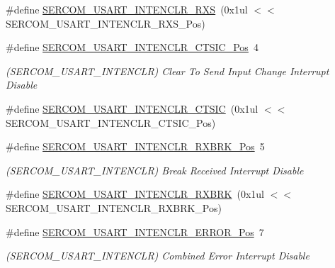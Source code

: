 \begin{DoxyCompactItemize}
\#define \mbox{\hyperlink{group___s_a_m_d21___s_e_r_c_o_m_ga74d2c1af12decedd2d5efebeac00948f}{S\+E\+R\+C\+O\+M\+\_\+\+U\+S\+A\+R\+T\+\_\+\+I\+N\+T\+E\+N\+C\+L\+R\+\_\+\+R\+XS}}~(0x1ul $<$$<$ S\+E\+R\+C\+O\+M\+\_\+\+U\+S\+A\+R\+T\+\_\+\+I\+N\+T\+E\+N\+C\+L\+R\+\_\+\+R\+X\+S\+\_\+\+Pos)
\item 
\#define \mbox{\hyperlink{group___s_a_m_d21___s_e_r_c_o_m_ga0751acc62d29f4afba27cf1972efaba6}{S\+E\+R\+C\+O\+M\+\_\+\+U\+S\+A\+R\+T\+\_\+\+I\+N\+T\+E\+N\+C\+L\+R\+\_\+\+C\+T\+S\+I\+C\+\_\+\+Pos}}~4
\begin{DoxyCompactList}\small\item\em (S\+E\+R\+C\+O\+M\+\_\+\+U\+S\+A\+R\+T\+\_\+\+I\+N\+T\+E\+N\+C\+LR) Clear To Send Input Change Interrupt Disable \end{DoxyCompactList}\item 
\#define \mbox{\hyperlink{group___s_a_m_d21___s_e_r_c_o_m_gaa3bd00b624143ff68630fd01aa7e5500}{S\+E\+R\+C\+O\+M\+\_\+\+U\+S\+A\+R\+T\+\_\+\+I\+N\+T\+E\+N\+C\+L\+R\+\_\+\+C\+T\+S\+IC}}~(0x1ul $<$$<$ S\+E\+R\+C\+O\+M\+\_\+\+U\+S\+A\+R\+T\+\_\+\+I\+N\+T\+E\+N\+C\+L\+R\+\_\+\+C\+T\+S\+I\+C\+\_\+\+Pos)
\item 
\#define \mbox{\hyperlink{group___s_a_m_d21___s_e_r_c_o_m_ga9f4ed3c5eb917a97501f586ae5170e27}{S\+E\+R\+C\+O\+M\+\_\+\+U\+S\+A\+R\+T\+\_\+\+I\+N\+T\+E\+N\+C\+L\+R\+\_\+\+R\+X\+B\+R\+K\+\_\+\+Pos}}~5
\begin{DoxyCompactList}\small\item\em (S\+E\+R\+C\+O\+M\+\_\+\+U\+S\+A\+R\+T\+\_\+\+I\+N\+T\+E\+N\+C\+LR) Break Received Interrupt Disable \end{DoxyCompactList}\item 
\#define \mbox{\hyperlink{group___s_a_m_d21___s_e_r_c_o_m_ga4025eb0f6591ca8b2709996c63aae3dd}{S\+E\+R\+C\+O\+M\+\_\+\+U\+S\+A\+R\+T\+\_\+\+I\+N\+T\+E\+N\+C\+L\+R\+\_\+\+R\+X\+B\+RK}}~(0x1ul $<$$<$ S\+E\+R\+C\+O\+M\+\_\+\+U\+S\+A\+R\+T\+\_\+\+I\+N\+T\+E\+N\+C\+L\+R\+\_\+\+R\+X\+B\+R\+K\+\_\+\+Pos)
\item 
\#define \mbox{\hyperlink{group___s_a_m_d21___s_e_r_c_o_m_ga15a234b6064382e6ba84366e5b2d2871}{S\+E\+R\+C\+O\+M\+\_\+\+U\+S\+A\+R\+T\+\_\+\+I\+N\+T\+E\+N\+C\+L\+R\+\_\+\+E\+R\+R\+O\+R\+\_\+\+Pos}}~7
\begin{DoxyCompactList}\small\item\em (S\+E\+R\+C\+O\+M\+\_\+\+U\+S\+A\+R\+T\+\_\+\+I\+N\+T\+E\+N\+C\+LR) Combined Error Interrupt Disable \end{DoxyCompactList}\item 
$$
\end{DoxyCompactItemize}
